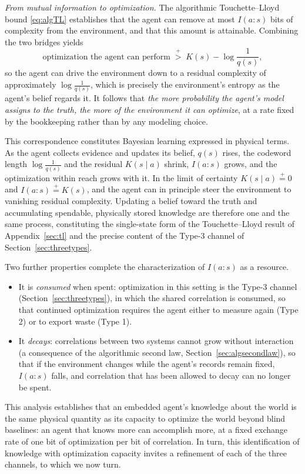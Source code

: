 \documentclass[10pt]{article}
\theoremstyle{definition}
\theoremstyle{remark}
\newcommand{\pgt}{\mathrel{\stackrel{+}{>}}}
\newcommand{\peq}{\mathrel{\stackrel{+}{=}}}
\begin{document}
\emph{From mutual information to optimization.} The algorithmic Touchette--Lloyd bound \eqref{eq:algTL} establishes that the agent can remove at most $I(a:s)$ bits of complexity from the environment, and that this amount is attainable. Combining the two bridges yields
\[
\text{optimization the agent can perform} \;\pgt\; K(s) - \log \frac{1}{q(s)},
\]
so the agent can drive the environment down to a residual complexity of approximately $\log\tfrac{1}{q(s)}$, which is precisely the environment's entropy as the agent's belief regards it. It follows that \emph{the more probability the agent's model assigns to the truth, the more of the environment it can optimize}, at a rate fixed by the bookkeeping rather than by any modeling choice.

This correspondence constitutes Bayesian learning expressed in physical terms. As the agent collects evidence and updates its belief, $q(s)$ rises, the codeword length $\log\tfrac{1}{q(s)}$ and the residual $K(s\mid a)$ shrink, $I(a:s)$ grows, and the optimization within reach grows with it. In the limit of certainty $K(s\mid a) \peq 0$ and $I(a:s) \peq K(s)$, and the agent can in principle steer the environment to vanishing residual complexity. Updating a belief toward the truth and accumulating spendable, physically stored knowledge are therefore one and the same process, constituting the single-state form of the Touchette--Lloyd result of Appendix~\ref{sec:tl} and the precise content of the Type-3 channel of Section~\ref{sec:threetypes}.

Two further properties complete the characterization of $I(a:s)$ as a resource.
\begin{itemize}[leftmargin=2em]
  \item It is \emph{consumed} when spent: optimization in this setting is the Type-3 channel (Section~\ref{sec:threetypes}), in which the shared correlation is consumed, so that continued optimization requires the agent either to measure again (Type 2) or to export waste (Type 1).
  \item It \emph{decays}: correlations between two systems cannot grow without interaction (a consequence of the algorithmic second law, Section~\ref{sec:algsecondlaw}), so that if the environment changes while the agent's records remain fixed, $I(a:s)$ falls, and correlation that has been allowed to decay can no longer be spent.
\end{itemize}

This analysis establishes that an embedded agent's knowledge about the world is the same physical quantity as its capacity to optimize the world beyond blind baselines: an agent that knows more can accomplish more, at a fixed exchange rate of one bit of optimization per bit of correlation. In turn, this identification of knowledge with optimization capacity invites a refinement of each of the three channels, to which we now turn.
\end{document}
